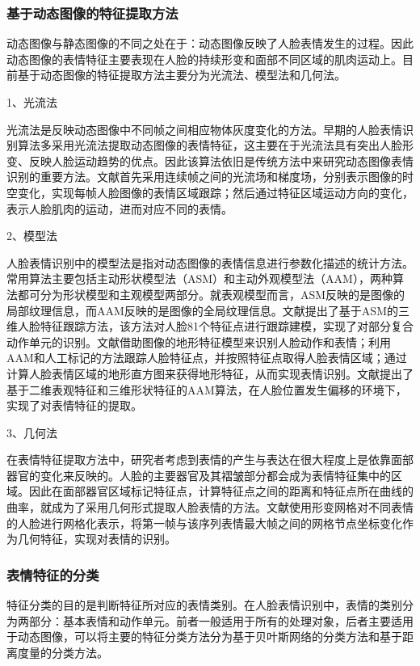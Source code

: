\subsubsection{基于动态图像的特征提取方法}

动态图像与静态图像的不同之处在于：动态图像反映了人脸表情发生的过程。因此动态图像的表情特征主要表现在人脸的持续形变和面部不同区域的肌肉运动上。目前基于动态图像的特征提取方法主要分为光流法、模型法和几何法。

1、光流法

光流法是反映动态图像中不同帧之间相应物体灰度变化的方法。早期的人脸表情识别算法多采用光流法提取动态图像的表情特征，这主要在于光流法具有突出人脸形变、反映人脸运动趋势的优点。因此该算法依旧是传统方法中来研究动态图像表情识别的重要方法。文献\cite{yacoob1996recognizing}首先采用连续帧之间的光流场和梯度场，分别表示图像的时空变化，实现每帧人脸图像的表情区域跟踪；然后通过特征区域运动方向的变化，表示人脸肌肉的运动，进而对应不同的表情。

2、模型法

人脸表情识别中的模型法是指对动态图像的表情信息进行参数化描述的统计方法。常用算法主要包括主动形状模型法（ASM）和主动外观模型法（AAM），两种算法都可分为形状模型和主观模型两部分。就表观模型而言，ASM反映的是图像的局部纹理信息，而AAM反映的是图像的全局纹理信息。文献\cite{tsalakanidou2010real}提出了基于ASM的三维人脸特征跟踪方法，该方法对人脸81个特征点进行跟踪建模，实现了对部分复合动作单元的识别。文献\cite{wang2007static}借助图像的地形特征模型来识别人脸动作和表情；利用AAM和人工标记的方法跟踪人脸特征点，并按照特征点取得人脸表情区域；通过计算人脸表情区域的地形直方图来获得地形特征，从而实现表情识别。文献\cite{sung2008pose}提出了基于二维表观特征和三维形状特征的AAM算法，在人脸位置发生偏移的环境下，实现了对表情特征的提取。

3、几何法

在表情特征提取方法中，研究者考虑到表情的产生与表达在很大程度上是依靠面部器官的变化来反映的。人脸的主要器官及其褶皱部分都会成为表情特征集中的区域。因此在面部器官区域标记特征点，计算特征点之间的距离和特征点所在曲线的曲率，就成为了采用几何形式提取人脸表情的方法。文献\cite{kotsia2006facial}使用形变网格对不同表情的人脸进行网格化表示，将第一帧与该序列表情最大帧之间的网格节点坐标变化作为几何特征，实现对表情的识别。

\subsubsection{表情特征的分类}

特征分类的目的是判断特征所对应的表情类别。在人脸表情识别中，表情的类别分为两部分：基本表情和动作单元。前者一般适用于所有的处理对象，后者主要适用于动态图像，可以将主要的特征分类方法分为基于贝叶斯网络的分类方法和基于距离度量的分类方法。

